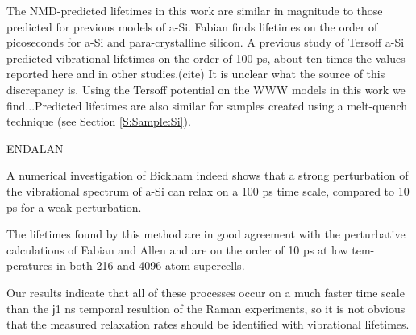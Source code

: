 \documentclass[aps,prb,onecolumn,preprint,superscriptaddress,footinbib,amsmath,amssymb,floatfix]{revtex4}
\begin{document}



The NMD-predicted lifetimes in this work are similar in magnitude to 
those predicted for previous models of a-Si. 
Fabian finds lifetimes on the order of picoseconds for a-Si and 
para-crystalline silicon.
\cite{fabian_anharmonic_1996,fabian_numerical_2003}
A previous study of Tersoff a-Si predicted vibrational lifetimes on 
the order of 100 ps, about ten times the values reported here and in 
other studies.(cite) It is unclear what the source of this 
discrepancy is.  Using the Tersoff potential on the WWW models in this 
work we find...Predicted lifetimes are also similar for 
samples created using a melt-quench technique 
(see Section \ref{S:Sample:Si}).

ENDALAN


A numerical investigation of Bickham\cite{bickham_numerical_1999} 
indeed shows that a strong perturbation of the vibrational
spectrum of a-Si can relax on a 100 ps time scale, compared
to 10 ps for a weak perturbation.\cite{bickham_calculation_1998} 
 
The lifetimes found by this method
are in good agreement with the perturbative calculations of
Fabian and Allen and are on the order of 10 ps at low tem-
peratures in both 216 and 4096 atom supercells.
\cite{bickham_calculation_1998}

Our results indicate that all of
these processes occur on a much faster time scale than the
ϳ1 ns temporal resultion of the Raman experiments, so it is
not obvious that the measured relaxation rates should be
identified with vibrational lifetimes.
\cite{bickham_numerical_1999}
\end{document}

